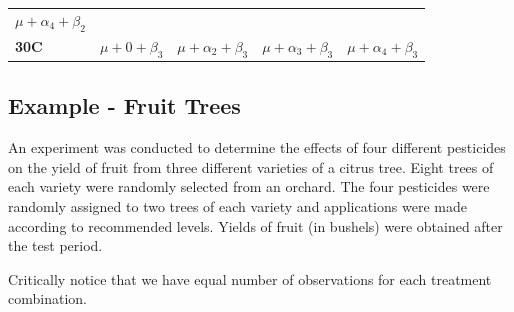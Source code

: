 \documentclass[]{book}
\theoremstyle{definition}
\theoremstyle{definition}
\theoremstyle{remark}
\begin{document}
\begin{longtable}[]{@{}lllll@{}}
\begin{minipage}[t]{0.21\columnwidth}
\(\mu+\alpha_4+\beta_2\)\strut
\end{minipage}\tabularnewline
\begin{minipage}[t]{0.08\columnwidth}\raggedright\strut
\textbf{30C}\strut
\end{minipage} & \begin{minipage}[t]{0.14\columnwidth}\raggedright\strut
\(\mu+0+\beta_3\)\strut
\end{minipage} & \begin{minipage}[t]{0.22\columnwidth}\raggedright\strut
\(\mu+\alpha_2+\beta_3\)\strut
\end{minipage} & \begin{minipage}[t]{0.21\columnwidth}\raggedright\strut
\(\mu+\alpha_3+\beta_3\)\strut
\end{minipage} & \begin{minipage}[t]{0.21\columnwidth}\raggedright\strut
\(\mu+\alpha_4+\beta_3\)\strut
\end{minipage}\tabularnewline
\bottomrule
\end{longtable}

\subsection{Example - Fruit Trees}\label{example---fruit-trees}

An experiment was conducted to determine the effects of four different
pesticides on the yield of fruit from three different varieties of a
citrus tree. Eight trees of each variety were randomly selected from an
orchard. The four pesticides were randomly assigned to two trees of each
variety and applications were made according to recommended levels.
Yields of fruit (in bushels) were obtained after the test period.

Critically notice that we have equal number of observations for each
treatment combination.
\end{document}
